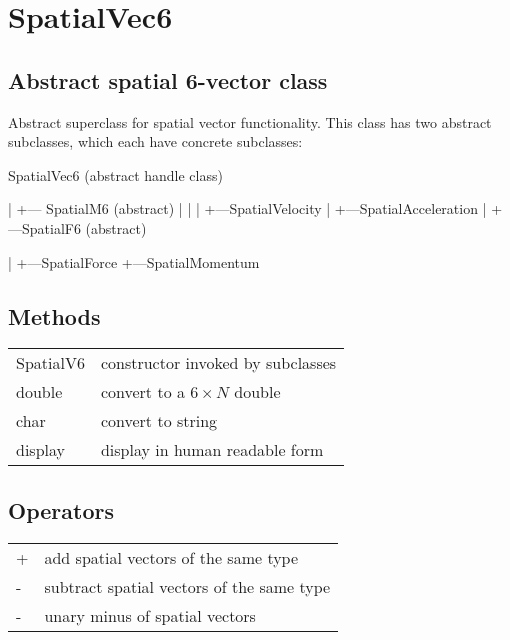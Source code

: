 \hypertarget{SpatialVec6}{\section*{SpatialVec6}}
\subsection*{Abstract spatial 6-vector class}


Abstract superclass for spatial vector functionality.  This class has two
abstract subclasses, which each have concrete subclasses:



SpatialVec6 (abstract handle class)

\begin{Code}
  |
  +--- SpatialM6 (abstract)
  |     |
  |     +---SpatialVelocity
  |     +---SpatialAcceleration
  |
  +---SpatialF6 (abstract)
\end{Code}
\begin{Code}
       |
       +---SpatialForce
       +---SpatialMomentum

\end{Code}

\subsection*{Methods}
\begin{longtable}{lp{120mm}}
SpatialV6 & constructor invoked by subclasses\\ 
double & convert to a $6 \times N$ double\\ 
char & convert to string\\ 
display & display in human readable form\\ 
\end{longtable}\vspace{1ex}

\subsection*{Operators}
\begin{longtable}{lp{120mm}}
+ & add spatial vectors of the same type\\ 
- & subtract spatial vectors of the same type\\ 
- & unary minus of spatial vectors\\ 
\end{longtable}\vspace{1ex}

